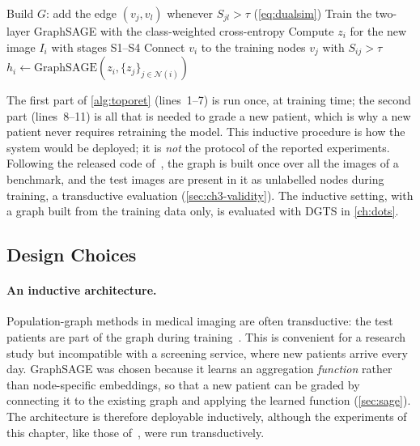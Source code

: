 \begin{algorithm}[H]
\caption{TOPORET: population-graph construction and inductive grading.}
\label{alg:toporet}
\DontPrintSemicolon
{}
\BlankLine
{}
Build $G$: add the edge $(v_j,v_l)$ whenever $S_{jl}>\tau$ (\cref{eq:dualsim})
Train the two-layer GraphSAGE with the class-weighted cross-entropy
\BlankLine
Compute $z_i$ for the new image $I_i$ with stages S1--S4\;
Connect $v_i$ to the training nodes $v_j$ with $S_{ij}>\tau$\;
$h_i \leftarrow \mathrm{GraphSAGE}(z_i,\{z_j\}_{j\in\mathcal{N}(i)})$
\end{algorithm}

The first part of \cref{alg:toporet} (lines~1--7) is run once, at training time; the second
part (lines~8--11) is all that is needed to grade a new patient, which is why a new
patient never requires retraining the model. This inductive procedure is how the system
would be deployed; it is \emph{not} the protocol of the reported experiments. Following the
released code of~\cite{belhadj2025plos}, the graph is built once over all the images of a
benchmark, and the test images are present in it as unlabelled nodes during training, a
transductive evaluation (\cref{sec:ch3-validity}). The inductive setting, with a graph built
from the training data only, is evaluated with DGTS in \cref{ch:dots}.

\subsection{Design Choices}
\label{sec:ch3-design}

\paragraph{An inductive architecture.}
Population-graph methods in medical imaging are often transductive: the test patients are
part of the graph during training~\cite{parisot2018disease}. This is convenient for a
research study but incompatible with a screening service, where new patients arrive every
day. GraphSAGE was chosen because it learns an aggregation \emph{function} rather than
node-specific embeddings, so that a new patient can be graded by connecting it to the
existing graph and applying the learned function (\cref{sec:sage}). The architecture is
therefore deployable inductively, although the experiments of this chapter, like those
of~\cite{parisot2018disease}, were run transductively.

